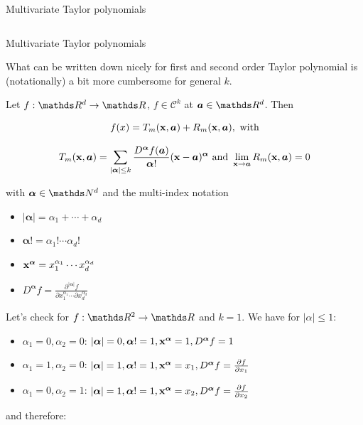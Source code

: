 \begin{vbframe}{Multivariate Taylor polynomials}
\begin{columns}
\begin{column}{0.3\textwidth}
    \end{column}
  \end{columns}  


\end{vbframe}


\begin{vbframe}{Multivariate Taylor polynomials}  

What can be written down nicely for first and second order Taylor polynomial is (notationally) a bit more cumbersome for general $k$.

\lz 

Let $f: \R^d \to \R$, $f \in \mathcal{C}^k$ at $\bm{a} \in \R^d$. Then 

$$
  f(x) = T_m(\mathbf{x}, \bm{a}) + R_m(\mathbf{x}, \bm{a}), \text{ with}
$$

$$
  T_m(\mathbf{x},\bm{a}) = \sum_{|\bm{\alpha}| \le k} \frac{D^{\bm{\alpha}} f(\bm{a})}{{\bm{\alpha}}!} (\mathbf{x} - \bm{a})^{\bm{\alpha}} \text{ and } \lim_{\mathbf{x} \to \bm{a}} R_m(\mathbf{x},\bm{a}) = 0
$$

with $\bm{\alpha} \in \N^d$ and the multi-index notation
\begin{itemize}
  \item $|\bm{\alpha}| = \alpha_1 + \cdots + \alpha_d$
  \item $\bm{\alpha}! = \alpha_1! \cdots \alpha_d!$
  \item $\mathbf{x}^{\bm{\alpha}} = x_1^{\alpha_1} \cdots x_d^{\alpha_d}$
  \item $D^{\bm{\alpha}} f = \frac{\partial^{|\bm{\alpha}|} f}{\partial x_1^{\alpha_1} \cdots \partial x_d^{\alpha_d}}$ 
\end{itemize}

\framebreak 

Let's check for $f: \R^2 \to \R$ and $k = 1$. We have for $|\alpha| \le 1$: 

\begin{itemize}
  \item $\alpha_1 = 0, \alpha_2 = 0$: $|\bm{\alpha}| = 0, \bm{\alpha}! = 1, \mathbf{x}^{\bm{\alpha}} = 1, D^{\bm{\alpha}} f = 1$
  \item $\alpha_1 = 1, \alpha_2 = 0$: $|\bm{\alpha}| = 1, \bm{\alpha}! = 1, \mathbf{x}^{\bm{\alpha}} = x_1, D^{\bm{\alpha}} f = \frac{\partial f}{\partial x_1}$
  \item $\alpha_1 = 0, \alpha_2 = 1$: $|\bm{\alpha}| = 1, \bm{\alpha}! = 1, \mathbf{x}^{\bm{\alpha}} = x_2, D^{\bm{\alpha}} f = \frac{\partial f}{\partial x_2}$
\end{itemize}

and therefore: 


\end{vbframe}
